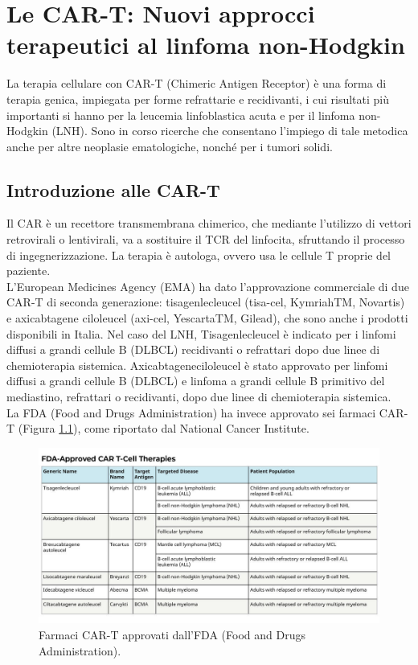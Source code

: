 \chapter{Le CAR-T: Nuovi approcci terapeutici al linfoma non-Hodgkin}

La terapia cellulare con CAR-T (Chimeric Antigen Receptor) è una forma di terapia genica, impiegata per forme 
refrattarie e recidivanti, i cui risultati più importanti si hanno per la leucemia linfoblastica acuta e per il 
linfoma non-Hodgkin (LNH). Sono in corso ricerche che consentano l’impiego di tale metodica anche per altre neoplasie 
ematologiche, nonché per i tumori solidi\cite{reteveneta}.

\section{Introduzione alle CAR-T}

Il CAR è un recettore transmembrana chimerico, che mediante l’utilizzo di vettori retrovirali o lentivirali, 
va a sostituire il TCR del linfocita, sfruttando il processo di ingegnerizzazione. La terapia è autologa, 
ovvero usa le cellule T proprie del paziente\cite{reteveneta}.\\
L’European Medicines Agency (EMA) ha dato l’approvazione commerciale di due CAR-T di seconda generazione: 
tisagenlecleucel (tisa-cel, KymriahTM, Novartis) e axicabtagene ciloleucel (axi-cel, YescartaTM, Gilead), 
che sono anche i prodotti disponibili in Italia\cite{reteveneta}.
Nel caso del LNH, Tisagenlecleucel è indicato per i linfomi diffusi a grandi cellule B (DLBCL) recidivanti o 
refrattari dopo due linee di chemioterapia sistemica. Axicabtageneciloleucel è stato approvato per linfomi 
diffusi a grandi cellule B (DLBCL) e linfoma a grandi cellule B primitivo del mediastino, 
refrattari o recidivanti, dopo due linee di chemioterapia sistemica\cite{EMATOCART}.\\
La FDA (Food and Drugs Administration) ha invece approvato sei farmaci CAR-T (Figura \ref{fig:FIGURE_3.8}), come 
riportato dal National Cancer Institute\cite{NIHCART}.

\begin{figure}[H]
    \begin{center}
    \vspace{-3mm}
    \includegraphics[width=0.9\columnwidth]{img/FDAApprovedCART.jpeg}
    \end{center}
    \caption{Farmaci CAR-T approvati dall’FDA (Food and Drugs Administration).
    \cite{NIHCART}}
    \label{fig:FIGURE_3.8}
\end{figure}

